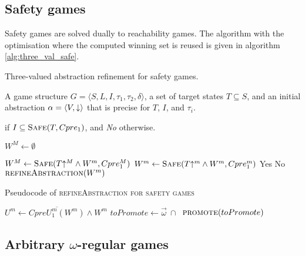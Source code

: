 \subsection{Safety games}

Safety games are solved dually to reachability games. The algorithm with the optimisation where the computed winning set is reused is given in algorithm \ref{alg:three_val_safe}.

\begin{algorithm}
\caption{Three-valued abstraction refinement for safety games.}
\label{alg:three_val_safe}

\begin{algorithmic}[1]

\Require A game structure $G = \langle S, L, I, \tau_1, \tau_2, \delta \rangle$, a set 
of target states $T\subseteq S$, and an initial abstraction $\alpha=\langle V, \mathord{\downarrow} \rangle$
that is precise for $T$, $I$, and $\tau_i$.

 if $I \subseteq \textsc{Safe}(T, Cpre_1)$, and {\it No} otherwise.

    \State $W^M \gets \emptyset$

    \Loop
        \State $W^M \gets \textsc{Safe}(T\mathord{\uparrow^M} \wedge W^m, Cpre_1^M)$
        \State $W^m \gets \textsc{Safe}(T\mathord{\uparrow^m} \wedge W^m, Cpre_1^m)$
            \State\Return Yes
            \State\Return No
        \Else       
            \State$\Call{refineAbstraction}{W^m}$
        \EndIf
    \EndLoop
\EndFunction

\end{algorithmic}
\end{algorithm}

\begin{algorithm}

\caption{Pseudocode of \textsc{refineAbstraction for safety games}}
\label{alg:refineAbstractionSafe}

\begin{algorithmic}[1]
\State $U^m \gets \overline{CpreU_1^{m}(W^m)} \land W^m$
    \State $toPromote \gets \vec{\omega}~\cap~$
    \State $\Call{promote}{toPromote}$
\EndFunction
\end{algorithmic}
\end{algorithm}

\subsection{Arbitrary $\omega$-regular games}

